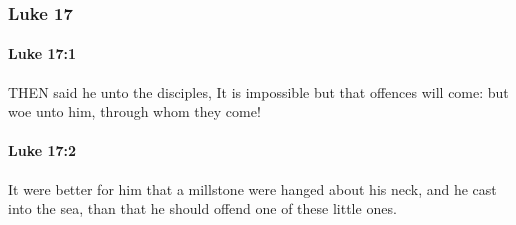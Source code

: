	\subsubsection{Luke 17} %
		\label{LUKE-17}
		
		\paragraph{Luke 17:1} %
			\label{LUKE-17-1}

			THEN said he unto the disciples, It is impossible but that offences will come: but woe unto him, through whom they come!

			\begin{framed}
			\scriptsize
				\begin{compactdesc}
					\item[SBLG] 
				\end{compactdesc}
			\end{framed}

		\paragraph{Luke 17:2} %
			\label{LUKE-17-2}

			It were better for him that a millstone were hanged about his neck, and he cast into the sea, than that he should offend one of these little ones.

